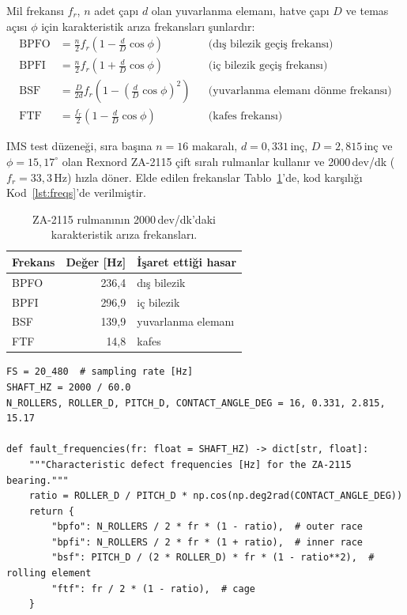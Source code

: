 \documentclass[11pt]{article}
\begin{document}
Mil frekansı $f_r$, $n$ adet çapı $d$ olan yuvarlanma elemanı, hatve çapı $D$ ve temas açısı $\phi$
için karakteristik arıza frekansları şunlardır:
\begin{align}
\text{BPFO} &= \frac{n}{2} f_r \left(1 - \frac{d}{D}\cos\phi\right) && \text{(dış bilezik geçiş frekansı)}\\
\text{BPFI} &= \frac{n}{2} f_r \left(1 + \frac{d}{D}\cos\phi\right) && \text{(iç bilezik geçiş frekansı)}\\
\text{BSF}  &= \frac{D}{2d} f_r \left(1 - \left(\frac{d}{D}\cos\phi\right)^2\right) && \text{(yuvarlanma elemanı dönme frekansı)}\\
\text{FTF}  &= \frac{f_r}{2} \left(1 - \frac{d}{D}\cos\phi\right) && \text{(kafes frekansı)}
\end{align}

IMS test düzeneği, sıra başına $n=16$ makaralı, $d = 0{,}331$\,inç, $D = 2{,}815$\,inç ve
$\phi = 15{,}17^\circ$ olan Rexnord ZA-2115 çift sıralı rulmanlar kullanır ve 2000\,dev/dk
($f_r = 33{,}3$\,Hz) hızla döner. Elde edilen frekanslar Tablo~\ref{tab:freqs}'de, kod karşılığı
Kod~\ref{lst:freqs}'de verilmiştir.

\begin{table}[H]
\centering
\caption{ZA-2115 rulmanının 2000\,dev/dk'daki karakteristik arıza frekansları.}
\label{tab:freqs}
\begin{tabular}{lrl}
\toprule
Frekans & Değer [Hz] & İşaret ettiği hasar \\
\midrule
BPFO & 236,4 & dış bilezik \\
BPFI & 296,9 & iç bilezik \\
BSF  & 139,9 & yuvarlanma elemanı \\
FTF  & 14,8  & kafes \\
\bottomrule
\end{tabular}
\end{table}

\begin{lstlisting}[caption={Rulman geometrisinden arıza frekansları (\code{src/bearing\_efw/dataset.py}).},label=lst:freqs]
FS = 20_480  # sampling rate [Hz]
SHAFT_HZ = 2000 / 60.0
N_ROLLERS, ROLLER_D, PITCH_D, CONTACT_ANGLE_DEG = 16, 0.331, 2.815, 15.17

def fault_frequencies(fr: float = SHAFT_HZ) -> dict[str, float]:
    """Characteristic defect frequencies [Hz] for the ZA-2115 bearing."""
    ratio = ROLLER_D / PITCH_D * np.cos(np.deg2rad(CONTACT_ANGLE_DEG))
    return {
        "bpfo": N_ROLLERS / 2 * fr * (1 - ratio),  # outer race
        "bpfi": N_ROLLERS / 2 * fr * (1 + ratio),  # inner race
        "bsf": PITCH_D / (2 * ROLLER_D) * fr * (1 - ratio**2),  # rolling element
        "ftf": fr / 2 * (1 - ratio),  # cage
    }
\end{lstlisting}
\end{document}
